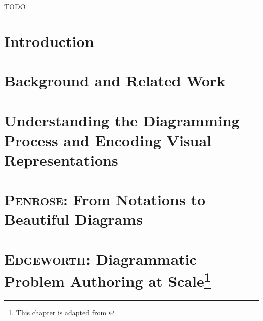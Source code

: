 \documentclass[12pt]{cmuthesis}
\newcommand*{\Penrose}{\textsc{Penrose}\xspace}
\newcommand*{\Edgeworth}{\textsc{Edgeworth}\xspace}
\begin{document}
\begin{acknowledgments}
TODO
\end{acknowledgments}


\tableofcontents
\listoffigures
\listoftables

\mainmatter


%
%
%
%
%


% 
\chapter{Introduction}


\chapter{Background and Related Work}
\label{chp:background}

\chapter{Understanding the Diagramming Process and Encoding Visual Representations}
\label{chp:interviews}
% 

\chapter{\Penrose: From Notations to Beautiful Diagrams}
\label{chp:penrose}
% 

\chapter[\Edgeworth: Diagrammatic Problem Authoring at Scale]{\Edgeworth: Diagrammatic Problem Authoring at Scale\footnote{This chapter is adapted from \citet[Sections~1--5]{ni_edgeworth_2024}}}
\label{chp:edgeworth}

\end{document}
